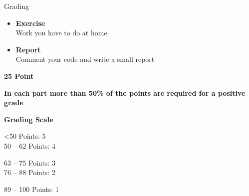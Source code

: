 \documentclass[aspectratio=169]{beamer}
\begin{document}
\begin{frame}{Grading}
\begin{minipage}[t][9.5cm]{\textwidth}
\begin{minipage}[t]{0.32\textwidth}
\begin{coloredblock}
\begin{itemize}
                    \item \footnotesize \textbf{Exercise}\\
                    Work you have to do at home.
                    \item \footnotesize \textbf{Report}\\
                    Comment your code and write a small report
                \end{itemize}
            \end{coloredblock}
            \centering \footnotesize \textbf{25 Point}
        \end{minipage}
    \end{minipage}
    
    \begin{coloredblock}[yellow]
        \centering\footnotesize\textbf{In each part more than 50\% of the points are required for a positive grade}
    \end{coloredblock}

    \vspace{0.5cm}
    \begin{coloredblock}[green]
        \begin{minipage}[c]{0.24\textwidth}
            \centering\footnotesize \textbf{Grading Scale}
        \end{minipage}
        \hfill
        \begin{minipage}[c]{0.24\textwidth}
            \footnotesize
            <50 Points:         5\\
            50 – 62 Points:     4
        \end{minipage}
        \hfill
        \begin{minipage}[c]{0.24\textwidth}
            \footnotesize
            63 – 75 Points:     3\\
            76 – 88 Points:     2
        \end{minipage}
        \hfill
        \begin{minipage}[t]{0.24\textwidth}
            \footnotesize
            89 – 100 Points:    1
        \end{minipage}
        
    \end{coloredblock}


\end{frame}
\end{document}
